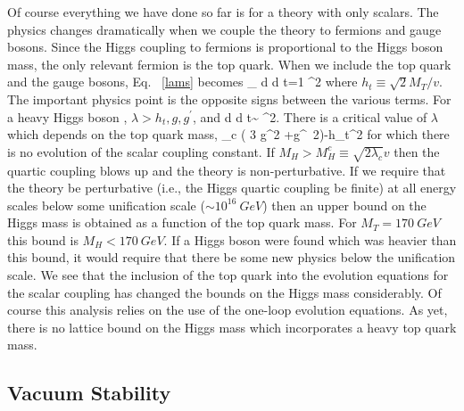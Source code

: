  Of course everything we have done so far is for a theory with only
scalars.  The physics changes dramatically
 when we couple the theory to fermions
and gauge bosons.
Since the Higgs coupling to fermions is proportional to the Higgs
boson mass, the only relevant fermion is the top quark.  When we include
the top quark and the gauge bosons, Eq. ~\ref{lams} becomes\cite{rge}
\beq
\beta_\lambda\equiv
{d \lambda \over d t}={1 \pi^2}
\label{renorm}
\eeq
where $h_t\equiv \sqrt{2} M_T/v$.  The important physics point is the
opposite signs between the various terms.  For a
heavy Higgs boson , $\lambda>h_t,g,g^{\prime}$, and
\beq
{d \lambda \over d t}\sim{\lambda{} \pi^2}.
\eeq
There is a critical value of $\lambda$ which depends on the top
quark mass,
\beq
\lambda_c ( 3 g^2 +g^{\prime~2})-{h_t^2}
\eeq
 for which  there is no evolution of the scalar
coupling constant.\cite{cab}
 If
$M_H>M_{H}^c\equiv \sqrt{2 \lambda_c} v$ then  the quartic coupling
blows up and the theory is non-perturbative.
If we require that the theory be perturbative (i.e.,
the Higgs quartic coupling be finite) at all energy scales
below some unification scale ($\sim 10^{16}~GeV$)
then an upper bound on the Higgs mass
is obtained as a function of the top quark mass.  For $M_T=170~GeV$
this bound is $M_H < 170~GeV$. \cite{cab}
  If a Higgs boson were found which was
heavier than this bound, it would require that there be some new
physics below the unification scale.
We see that the inclusion of the top quark into the evolution equations
for the scalar coupling has changed the bounds on the Higgs mass
considerably.  Of course this analysis relies on the use of the
one-loop evolution equations.  As yet, there is no lattice bound
on the Higgs mass which incorporates a heavy top quark mass.


\subsection{Vacuum Stability}

